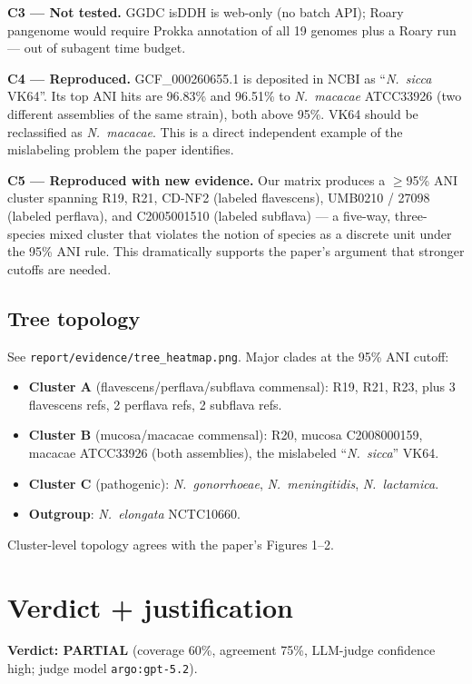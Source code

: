 \documentclass[11pt]{article}
\begin{document}
\textbf{C3 --- Not tested.} GGDC isDDH is web-only (no batch API); Roary pangenome would require Prokka annotation of all 19 genomes plus a Roary run --- out of subagent time budget.

\textbf{C4 --- Reproduced.} GCF\_000260655.1 is deposited in NCBI as ``\emph{N.\ sicca} VK64''. Its top ANI hits are 96.83\% and 96.51\% to \emph{N.\ macacae} ATCC33926 (two different assemblies of the same strain), both above 95\%. VK64 should be reclassified as \emph{N.\ macacae}. This is a direct independent example of the mislabeling problem the paper identifies.

\textbf{C5 --- Reproduced with new evidence.} Our matrix produces a $\geq$95\% ANI cluster spanning R19, R21, CD-NF2 (labeled flavescens), UMB0210 / 27098 (labeled perflava), and C2005001510 (labeled subflava) --- a five-way, three-species mixed cluster that violates the notion of species as a discrete unit under the 95\% ANI rule. This dramatically supports the paper's argument that stronger cutoffs are needed.

\subsection{Tree topology}

See \texttt{report/evidence/tree\_heatmap.png}. Major clades at the 95\% ANI cutoff:

\begin{itemize}
\item \textbf{Cluster A} (flavescens/perflava/subflava commensal): R19, R21, R23, plus 3 flavescens refs, 2 perflava refs, 2 subflava refs.
\item \textbf{Cluster B} (mucosa/macacae commensal): R20, mucosa C2008000159, macacae ATCC33926 (both assemblies), the mislabeled ``\emph{N.\ sicca}'' VK64.
\item \textbf{Cluster C} (pathogenic): \emph{N.\ gonorrhoeae}, \emph{N.\ meningitidis}, \emph{N.\ lactamica}.
\item \textbf{Outgroup}: \emph{N.\ elongata} NCTC10660.
\end{itemize}

Cluster-level topology agrees with the paper's Figures 1--2.

\section{Verdict + justification}

\textbf{Verdict: PARTIAL} (coverage 60\%, agreement 75\%, LLM-judge confidence high; judge model \texttt{argo:gpt-5.2}).
\end{document}

